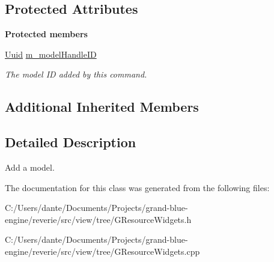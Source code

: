 \subsection*{Protected Attributes}
\begin{Indent}\textbf{ Protected members}\par
\begin{DoxyCompactItemize}
\item 
\mbox{\label{classrev_1_1_add_model_command_a2211066209c41785cb6c0447712e8bd5}} 
\mbox{\hyperlink{classrev_1_1_uuid}{Uuid}} \mbox{\hyperlink{classrev_1_1_add_model_command_a2211066209c41785cb6c0447712e8bd5}{m\+\_\+model\+Handle\+ID}}
\begin{DoxyCompactList}\small\item\em The model ID added by this command. \end{DoxyCompactList}\end{DoxyCompactItemize}
\end{Indent}
\subsection*{Additional Inherited Members}


\subsection{Detailed Description}
Add a model. 

The documentation for this class was generated from the following files\+:\begin{DoxyCompactItemize}
\item 
C\+:/\+Users/dante/\+Documents/\+Projects/grand-\/blue-\/engine/reverie/src/view/tree/G\+Resource\+Widgets.\+h\item 
C\+:/\+Users/dante/\+Documents/\+Projects/grand-\/blue-\/engine/reverie/src/view/tree/G\+Resource\+Widgets.\+cpp\end{DoxyCompactItemize}
